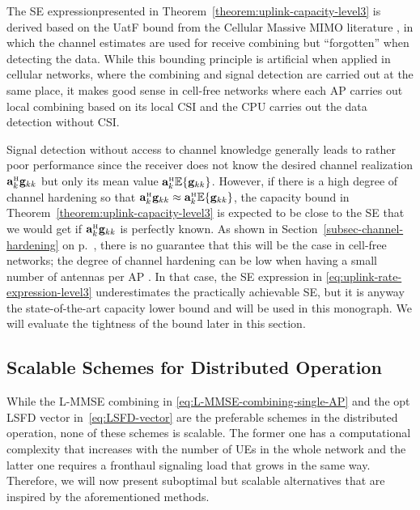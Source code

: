 \begin{remark}  \label{remark-tightness-bounds}
The SE expression\linebreak presented in Theorem~\ref{theorem:uplink-capacity-level3} is derived based on the \gls{UatF} bound from the Cellular Massive MIMO literature \cite{massivemimobook}, \cite{Marzetta2016a} in which the channel estimates are used for receive combining but ``forgotten'' when detecting the data. While this bounding principle is artificial when applied in cellular networks, where the combining and signal detection are carried out at the same place, it makes good sense in cell-free networks where each AP carries out local combining based on its local CSI and the CPU carries out the data detection without CSI.

Signal detection without access to channel knowledge generally leads to rather poor performance since the receiver does not know the desired channel realization $\vect{a}_{k}^{\Htran} \vect{g}_{kk}$ but only its mean value $\vect{a}_{k}^{\Htran} \mathbb{E}\{ \vect{g}_{kk}\}$. However, if there is a high degree of channel hardening so that 
$\vect{a}_{k}^{\Htran} \vect{g}_{kk} \approx \vect{a}_{k}^{\Htran} \mathbb{E}\{ \vect{g}_{kk}\}$, the capacity bound in Theorem~\ref{theorem:uplink-capacity-level3} is expected to be close to the SE that we would get if $\vect{a}_{k}^{\Htran} \vect{g}_{kk}$ is perfectly known.
As shown in Section~\ref{subsec-channel-hardening} on p.~\pageref{subsec-channel-hardening}, there is no guarantee that this will be the case in cell-free networks; the degree of channel hardening can be low when  having a small number of antennas per AP \cite{Chen2018b}. In that case, the SE expression in \eqref{eq:uplink-rate-expression-level3} underestimates the practically achievable SE, but it is anyway the state-of-the-art capacity lower bound and will be used in this monograph. We will evaluate the tightness of the bound later in this section.
\end{remark}



\enlargethispage{\baselineskip} 

\subsection{Scalable Schemes for Distributed Operation}\label{sec:combining-schemes-for-distributed-operation}

While the L-MMSE combining in \eqref{eq:L-MMSE-combining-single-AP} and the opt LSFD vector in~\eqref{eq:LSFD-vector} are the preferable schemes in the distributed operation, none of these schemes is scalable. The former one has a computational complexity that increases with the number of UEs in the whole network and  the latter one requires a fronthaul signaling load that grows in the same way.
Therefore, we will now present suboptimal but scalable alternatives that are inspired by the aforementioned methods.

